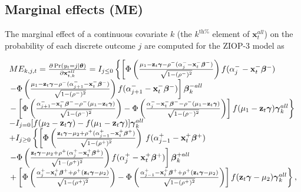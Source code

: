 \documentclass[letterpaper,fleqn,12pt]{article}
\begin{document}
\begin{onehalfspace}
\subsection{Marginal effects (ME)}

\noindent The marginal effect of a continuous covariate $k$ (the $k^{\text{th%
}}$ element of $\mathbf{x}_{t}^{all}$) on the probability of each discrete
outcome $j$ are computed for the ZIOP-3 model as

\bigskip

$%
\begin{array}{l}
ME_{k,j,t}=\frac{\partial \Pr (y_{t}=j|\mathbf{\theta })}{\partial \mathbf{x}%
_{t,k}^{all}}=I_{j\leq 0}\left\{ \left[ \Phi \left( \frac{\mu _{1}-\mathbf{z}%
_{t}\mathbf{\gamma }-\rho ^{-}(\alpha _{j}^{-}-\mathbf{x}_{t}^{-}\mathbf{%
\beta ^{-})}}{\sqrt{1-(\rho ^{-})^{2}}}\right) f(\alpha _{j}^{-}-\mathbf{x}%
_{t}^{-}\mathbf{\beta ^{-}})\right. \right. \\ 
\left. -\Phi \left( \frac{\mu _{1}-\mathbf{z}_{t}\mathbf{\gamma }-\rho
^{-}(\alpha _{j+1}^{-}-\mathbf{x}_{t}^{-}\mathbf{\beta ^{-})}}{\sqrt{1-(\rho
^{-})^{2}}}\right) f(\alpha _{j+1}^{-}-\mathbf{x}_{t}^{-}\mathbf{\beta ^{-}})%
\right] \mathbf{\beta }_{k}^{-all} \\ 
\left. -\left[ \Phi \left( \frac{\alpha _{j+1}^{-}-\mathbf{x}_{t}^{-}\mathbf{%
\beta ^{-}}-\rho ^{-}(\mu _{1}-\mathbf{z}_{t}\mathbf{\gamma )}}{\sqrt{%
1-(\rho ^{-})^{2}}}\right) -\Phi \left( \frac{\alpha _{j}^{-}-\mathbf{x}%
_{t}^{-}\mathbf{\beta ^{-}}-\rho ^{-}(\mu _{1}-\mathbf{z}_{t}\mathbf{\gamma )%
}}{\sqrt{1-(\rho ^{-})^{2}}}\right) \right] f(\mu _{1}-\mathbf{z}_{t}\mathbf{%
\gamma })\mathbf{\gamma }_{k}^{all}\right\} \\ 
-I_{j=0}[f(\mu _{2}-\mathbf{z}_{t}\mathbf{\gamma })-f(\mu _{1}-\mathbf{z}_{t}%
\mathbf{\gamma })]\mathbf{\gamma }_{k}^{all} \\ 
+I_{j\geq 0}\left\{ \left[ \Phi \left( \frac{\mathbf{z}_{t}\mathbf{\gamma }%
-\mu _{2}+\rho ^{+}(\alpha _{j-1}^{+}-\mathbf{x}_{t}^{+}\mathbf{\beta ^{+})}%
}{\sqrt{1-(\rho ^{+})^{2}}}\right) \right. \right. f(\alpha _{j-1}^{+}-%
\mathbf{x}_{t}^{+}\mathbf{\beta ^{+}}) \\ 
\left. -\Phi \left( \frac{\mathbf{z}_{t}\mathbf{\gamma }-\mu _{2}+\rho
^{+}(\alpha _{j}^{+}-\mathbf{x}_{t}^{+}\mathbf{\beta ^{+})}}{\sqrt{1-(\rho
^{+})^{2}}}\right) f(\alpha _{j}^{+}-\mathbf{x}_{t}^{+}\mathbf{\beta ^{+}})%
\right] \mathbf{\beta }_{k}^{+all} \\ 
\left. +\left[ \Phi \left( \frac{\alpha _{j}^{+}-\mathbf{x}_{t}^{+}\mathbf{%
\beta ^{+}}+\rho ^{+}(\mathbf{z}_{t}\mathbf{\gamma }-\mu _{2}\mathbf{)}}{%
\sqrt{1-(\rho ^{+})^{2}}}\right) -\Phi \left( \frac{\alpha _{j-1}^{+}-%
\mathbf{x}_{t}^{+}\mathbf{\beta ^{+}}+\rho ^{+}(\mathbf{z}_{t}\mathbf{\gamma 
}-\mu _{2}\mathbf{)}}{\sqrt{1-(\rho ^{+})^{2}}}\right) \right] f(\mathbf{z}%
_{t}\mathbf{\gamma }-\mu _{2})\mathbf{\gamma }_{k}^{all}\right\} ,%
\end{array}%
$


\end{onehalfspace}
\end{document}
